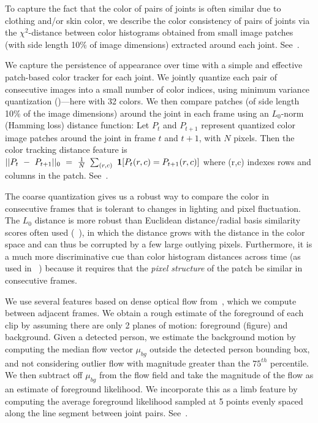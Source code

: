  To capture the fact that the color of pairs of 
joints is often similar due to clothing and/or skin color, we describe the 
color consistency of pairs of joints via the $\chi^2$-distance between color 
histograms obtained from small image patches (with side length 10\% of image 
dimensions) extracted around each joint.  See~.

  We capture the persistence of appearance over 
time with a simple and effective patch-based color tracker for each joint.  We 
jointly quantize each pair of consecutive images into a small number of color 
indices, using minimum variance quantization ()---here with 32 
colors.  We then compare patches (of side length 10\% of the image dimensions) 
around the joint in each frame using an $L_0$-norm (Hamming loss) distance 
function:  Let $P_{t}$ and $P_{t+1}$ represent quantized color image patches 
around the joint in frame $t$ and $t+1$, with $N$ pixels.  Then the color 
tracking distance feature is $ 
||P_t~-~P_{t+1}||_0~=~\frac{1}{N}~\sum_{(r,c)}~\mathbf{1}[P_{t}(r,c)=P_{t+1}(r,c)]$ 
where (r,c) indexes rows and columns in the patch.  
See~.

The coarse quantization gives us a robust way to compare the color in 
consecutive frames that is tolerant to changes in lighting and pixel 
fluctuation.  The $L_0$ distance is more robust than Euclidean distance/radial 
basis similarity scores often used (\eg~\citet{gould08ijcv}), in which the 
distance grows with the distance in the color space and can thus be corrupted 
by a few large outlying pixels.  Furthermore, it is a much more discriminative 
cue than color histogram distances across time (as used in \eg~\citet{ren07}) 
because it requires that the {\em pixel structure} of the patch be similar in 
consecutive frames.  

We use several features based on dense optical flow from~\citet{liu-optflow}, 
which we compute between adjacent frames. We obtain a rough estimate of the 
foreground of each clip by assuming there are only 2 planes of motion: 
foreground (figure) and background.  Given a detected person, we estimate the 
background motion by computing the median flow vector $\mu_{bg}$ outside the 
detected person bounding box, and not considering outlier flow with magnitude 
greater than the $75^{th}$ percentile.  We then subtract off $\mu_{bg}$ from 
the flow field and take the magnitude of the flow as an estimate of foreground 
likelihood.  We incorporate this as a
limb feature by computing the average foreground likelihood sampled at 5 points 
evenly spaced along the line segment between joint pairs.
See~.

